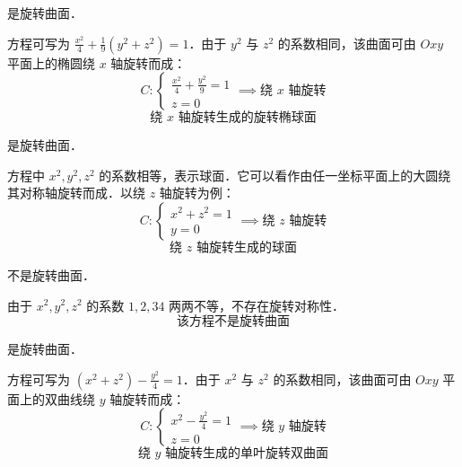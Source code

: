 \begin{solution}
     是旋转曲面．

    方程可写为 $\frac{x^2}{4} + \frac{1}{9}(y^2 + z^2) = 1$．由于 $y^2$ 与 $z^2$ 的系数相同，该曲面可由 $Oxy$ 平面上的椭圆绕 $x$ 轴旋转而成：
    \begin{equation}
        C: \begin{cases} \frac{x^2}{4} + \frac{y^2}{9} = 1 \\ z = 0 \end{cases} \implies \text{绕 } x \text{ 轴旋转}
    \end{equation}
    \begin{equation}
        \boxed{\text{绕 } x \text{ 轴旋转生成的旋转椭球面}}
    \end{equation}

     是旋转曲面．

    方程中 $x^2, y^2, z^2$ 的系数相等，表示球面．它可以看作由任一坐标平面上的大圆绕其对称轴旋转而成．以绕 $z$ 轴旋转为例：
    \begin{equation}
        C: \begin{cases} x^2 + z^2 = 1 \\ y = 0 \end{cases} \implies \text{绕 } z \text{ 轴旋转}
    \end{equation}
    \begin{equation}
        \boxed{\text{绕 } z \text{ 轴旋转生成的球面}}
    \end{equation}

     不是旋转曲面．

    由于 $x^2, y^2, z^2$ 的系数 $1, 2, 34$ 两两不等，不存在旋转对称性．
    \begin{equation}
        \boxed{\text{该方程不是旋转曲面}}
    \end{equation}

     是旋转曲面．

    方程可写为 $(x^2 + z^2) - \frac{y^2}{4} = 1$．由于 $x^2$ 与 $z^2$ 的系数相同，该曲面可由 $Oxy$ 平面上的双曲线绕 $y$ 轴旋转而成：
    \begin{equation}
        C: \begin{cases} x^2 - \frac{y^2}{4} = 1 \\ z = 0 \end{cases} \implies \text{绕 } y \text{ 轴旋转}
    \end{equation}
    \begin{equation}
        \boxed{\text{绕 } y \text{ 轴旋转生成的单叶旋转双曲面}}
    \end{equation}


\end{solution}
